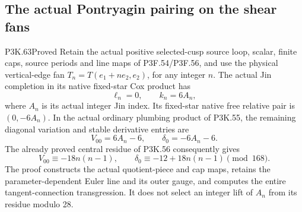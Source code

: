 \subsection{The actual Pontryagin pairing on the shear fans}
\begin{statement}{P3K.63}{Proved}
Retain the actual positive selected-cusp source loop, scalar, finite
caps, source periods and line maps of P3F.54/P3F.56, and use the
physical vertical-edge fan \(T_n=T(e_1+ne_2,e_2)\), for any integer
\(n\). The actual Jin completion in its native fixed-star Cox product
has
\[
 \ell_n=0,\qquad k_n=6A_n,
\]
where \(A_n\) is its actual integer Jin index. Its fixed-star native
free relative pair is \((0,-6A_n)\). In the actual ordinary plumbing
product of P3K.55, the remaining diagonal variation and stable
derivative entries are
\[
 V_{00}=6A_n-6,\qquad\delta_0=-6A_n-6.
\]
The already proved central residue of P3K.56 consequently gives
\[
 V_{00}\equiv-18n(n-1),\qquad
 \delta_0\equiv-12+18n(n-1)\pmod{168}.
\]
The proof constructs the actual quotient-piece and cap maps, retains
the parameter-dependent Euler line and its outer gauge, and computes
the entire tangent-connection transgression. It does not select an
integer lift of \(A_n\) from its residue modulo 28.
\end{statement}
